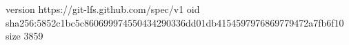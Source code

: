 version https://git-lfs.github.com/spec/v1
oid sha256:5852c1bc5c860699974550434290336dd01db4154597976869779472a7fb6f10
size 3859
